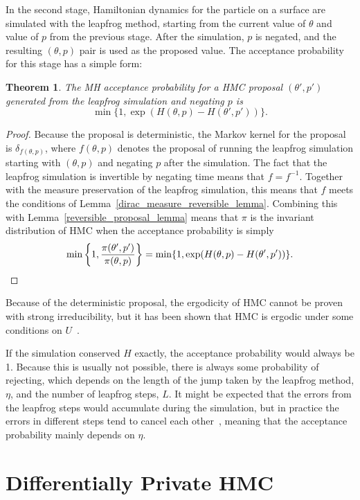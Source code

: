 \documentclass[english,twoside,openright]{HYgraduMLDS}
\newtheorem{theorem}[lemma]{Theorem}
\begin{document}
In the second stage, Hamiltonian dynamics for the particle on a surface are 
simulated with the leapfrog method, starting from the current value 
of \(\theta\) and value of \(p\) from the previous stage. After the simulation,
\(p\) is negated, and the resulting \((\theta, p)\) pair is used as the
proposed value. The acceptance probability for this stage has a simple
form:
\begin{theorem}
	The MH acceptance probability for a HMC proposal \((\theta', p')\) generated
  from the leapfrog simulation and negating \(p\) is
  \[
    \min\{1, \exp(H(\theta, p) - H(\theta', p'))\}.
  \]
\end{theorem}
\begin{proof}
  Because the proposal is deterministic, the Markov kernel for the
  proposal is \(\delta_{f(\theta, p)}\), where \(f(\theta, p)\) denotes the proposal
  of running the leapfrog simulation starting with \((\theta, p)\) and negating
  \(p\) after the simulation. The fact that the leapfrog simulation is invertible
  by negating time means
  that \(f = f^{-1}\). Together with the measure preservation of the leapfrog
  simulation, this means that \(f\) meets the conditions of
  Lemma~\ref{dirac_measure_reversible_lemma}. Combining this with
  Lemma~\ref{reversible_proposal_lemma} means that \(\pi\) is the invariant
  distribution of HMC when the acceptance probability is simply
  \[
    \min\left\{1, \frac{\pi(\theta', p')}{\pi(\theta, p)}\right\}
    = \min\{1, \exp(H(\theta, p) - H(\theta', p'))\}.
    \qedhere
  \]
\end{proof}

Because of the deterministic proposal, the ergodicity of HMC cannot be
proven with strong irreducibility, but it has been shown that HMC is
ergodic under some conditions on \(U\)~\cite{DMS20}.

If the simulation conserved \(H\) exactly, the acceptance probability would 
always be 1. Because this is usually not possible, there is always some probability 
of rejecting, which depends on the length of the jump taken by the leapfrog 
method, \(\eta\), and the number of leapfrog steps, \(L\). It might be expected 
that the errors from the leapfrog steps would accumulate during the simulation, 
but in practice the errors in different steps tend to cancel each 
other~\cite{neal2012mcmc}, meaning 
that the acceptance probability mainly depends on \(\eta\).

\section{Differentially Private HMC}\label{dp_hmc_section}
\end{document}
